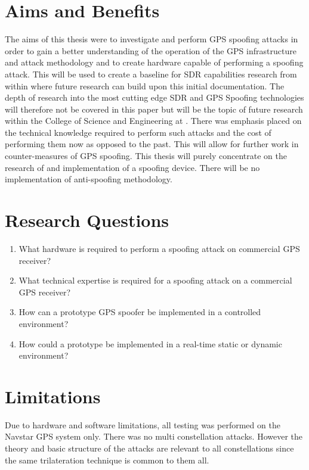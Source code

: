 \section{Aims and Benefits}\label{sec:Aims}
The aims of this thesis were to investigate and perform GPS spoofing attacks in order to gain a better understanding of the operation of the GPS infrastructure and attack
methodology and to create hardware capable of performing a spoofing attack. This will be used to create a baseline for SDR capabilities research from within \univname where future research can build upon this initial documentation.
The depth of research into the most cutting edge SDR and GPS Spoofing technologies will therefore not be covered in this paper but will be the topic of future research
within the College of Science and Engineering at \univname.
There was  emphasis placed on the technical knowledge required to perform such attacks and the cost of performing them now as opposed to the past. This will
allow for further work in counter-measures of GPS spoofing.
This thesis will purely concentrate on the research of and implementation of a spoofing device. There will be no implementation of anti-spoofing methodology.

\section{Research Questions}\label{sec:RQs}
\begin{enumerate}
    \item What hardware is required to perform a spoofing attack on commercial GPS receiver?
    \item What technical expertise is required for a spoofing attack on a commercial GPS receiver?
    \item How can a prototype GPS spoofer be implemented in a controlled environment?
    \item How could a prototype be implemented in a real-time static or dynamic environment? 
\end{enumerate}

\section{Limitations}\label{sec:Limits}
Due to hardware and software limitations, all testing was performed on the Navstar GPS system only. There was no multi constellation attacks. However the theory and basic
structure of the attacks are relevant to all constellations since the same trilateration technique is common to them all.

